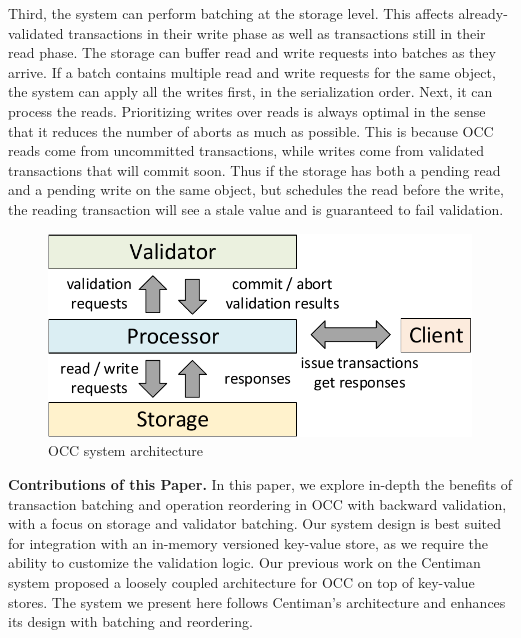 Third, the system can perform batching at the storage level. This affects already-validated transactions in their write phase as well as transactions still in their read phase. The storage can buffer read and write requests into batches as they arrive. If a batch contains multiple read and write requests for the same object, the system can apply all the writes first, in the serialization order. Next, it can process the reads. Prioritizing writes over reads is always optimal in the sense that it reduces the number of aborts as much as possible. This is because OCC reads come from uncommitted transactions, while writes come from validated transactions that will commit soon. Thus if the storage has both a pending read and a pending write on the same object, but schedules the read before the write, the reading transaction will see a stale value and is guaranteed to fail validation. 


\begin{figure}[t]
 \centering
 \includegraphics[width=0.9\columnwidth]{figures/arch.pdf}
 \vspace{-.5em}
 \caption{OCC system architecture}
 \vspace{-1em}
 \label{fig:occ_arch}
\end{figure}


{\bf Contributions of this Paper.}
In this paper, we explore in-depth the benefits of transaction batching and operation reordering in OCC with backward validation, with a focus on storage and validator batching. Our system design is best suited for integration with an in-memory versioned key-value store, as we require the ability to customize the validation logic. Our previous work on the Centiman system\cite{ding2015centiman} proposed a loosely coupled architecture for OCC on top of key-value stores. The system we present here follows Centiman's architecture and enhances its design with batching and reordering.

